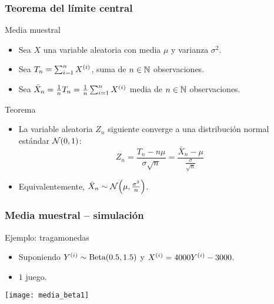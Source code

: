\documentclass[table]{beamer}
\begin{document}
\begin{frame}
    \frametitle{Teorema del límite central}
    \begin{block}{Media muestral}
        \begin{itemize}
            \item Sea $X$ una variable aleatoria con media $\mu$ y varianza $\sigma^{2}$.
            \item Sea $T_{n} = \sum_{i = 1}^{n} X^{\parens{i}}$, suma de $n \in \mathbb{N}$ observaciones.
            \item Sea $\bar{X}_{n} = \frac{1}{n} T_{n} = \frac{1}{n} \sum_{i = 1}^{n} X^{\parens{i}}$ media de $n \in \mathbb{N}$ observaciones.
        \end{itemize}
    \end{block}
    \begin{block}{Teorema}
        \begin{itemize}
            \item La variable aleatoria $Z_{n}$ siguiente converge a una distribución normal estándar $\normal{0}{1}$:
                \begin{equation*}
                    Z_{n} = \frac{T_{n} - n \mu}{\sigma \sqrt{n}}
                    = \frac{\bar{X}_{n} - \mu}{\frac{\sigma}{\sqrt{n}}}
                \end{equation*}
            \item Equivalentemente, $\bar{X}_{n} \sim \normal{\mu}{\frac{\sigma^{2}}{n}}$.
        \end{itemize}
    \end{block}
\end{frame}

\begin{frame}
    \frametitle{Media muestral -- simulación}
    \begin{block}{Ejemplo: tragamonedas}
        \begin{itemize}
            \item Suponiendo $Y^{\parens{i}} \sim \betadist{0.5}{1.5}$ y $X^{\parens{i}} = 4000 Y^{\parens{i}} - 3000$.
            \item $1$ juego.
        \end{itemize}
    \end{block}
    \begin{center}
        \texttt{[image: media\_beta1]}
    \end{center}
\end{frame}
\end{document}

